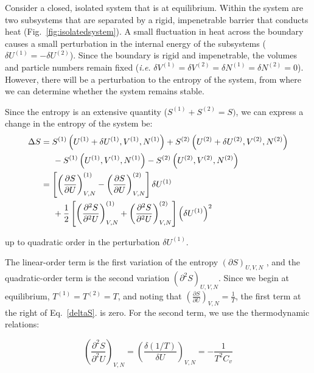 \documentclass[book.tex]{subfiles}
\begin{document}
Consider a closed, isolated system that is at equilibrium. Within the system are two subsystems that are separated by a rigid, impenetrable barrier that conducts heat (Fig.~\ref{fig:isolatedsystem}). A small fluctuation in heat across the boundary causes a small perturbation in the internal energy of the subsystems ($\delta U^{(1)} = -\delta U^{(2)}$). Since the boundary is rigid and impenetrable, the volumes and particle numbers remain fixed (\textit{i.e.} $\delta V^{(1)} = \delta V^{(2)}=\delta N^{(1)} = \delta N^{(2)}=0$). However, there will be a perturbation to the entropy of the system, from where we can determine whether the system remains stable.

Since the entropy is an extensive quantity ($S^{(1)}+S^{(2)} = S)$, we can express a change in the entropy of the system be:
\begin{align} \label{deltaS}
\Delta S &= S^{(1)} \left( U^{(1)}+\delta U^{(1)},V^{(1)},N^{(1)}\right) +S^{(2)} \left( U^{(2)}+\delta U^{(2)},V^{(2)},N^{(2)}\right) 
\notag\\  
& \hspace{0.5cm} -S^{(1)} \left( U^{(1)},V^{(1)},N^{(1)}\right) -S^{(2)} \left( U^{(2)},V^{(2)},N^{(2)}\right) 
\notag\\
&=\left[{\left(\frac{\partial S}{\partial U}\right)}_{V,N}^{(1)}-{\left(\frac{\partial S}{\partial U}\right)}_{V,N}^{(2)}\right]\delta U^{(1)} 
\notag\\  
& \hspace{0.5cm} + \frac{1}{2}\left[{\left(\frac{\partial^2 S}{\partial^2 U}\right)}_{V,N}^{(1)}+{\left(\frac{\partial^2 S}{\partial^2 U}\right)}_{V,N}^{(2)}\right]{\left(\delta U^{(1)}\right)}^2
\end{align}

\noindent up to quadratic order in the perturbation $\delta U^{(1)}$.

The linear-order term is the first variation of the entropy $\left(\partial S\right)_{U,V,N}$ , and the quadratic-order term is the second variation $\left(\partial^2 S\right)_{U,V,N}$. 
Since we begin at equilibrium, $T^{(1)}=T^{(2)}=T$,  and noting that ${\left(\frac{\partial S}{\partial U}\right)}_{V,N}=\frac{1}{T}$, the first term at the right of Eq.~\ref{deltaS}. is zero. For the second term, we use the thermodynamic relations:

\begin{equation}
{\left(\frac{\partial^2 S}{\partial^2 U}\right)}_{V,N} = \left(\frac{\delta (1/T)}{\delta U}\right)_{V,N} = -\frac{1}{T^2C_v}
\end{equation}
\end{document}
